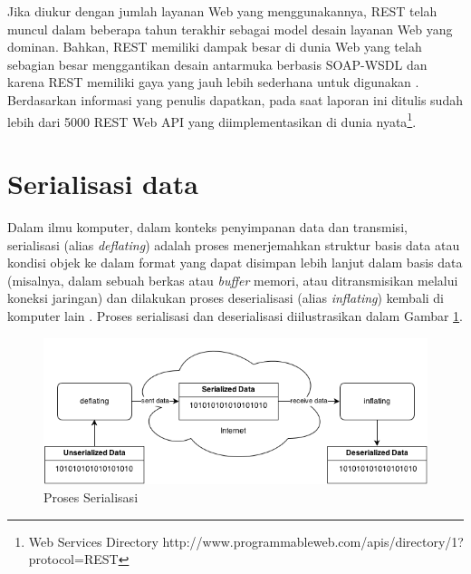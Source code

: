 \documentclass[a4paper, 12pt, oneside]{report}
\begin{document}
\onehalfspacing Jika diukur dengan jumlah layanan Web yang menggunakannya, REST telah muncul dalam beberapa tahun terakhir sebagai model desain layanan Web yang dominan. Bahkan, REST memiliki dampak besar di dunia Web yang telah sebagian besar menggantikan desain antarmuka berbasis SOAP-WSDL dan karena REST memiliki gaya yang jauh lebih sederhana untuk digunakan \cite{ws-restful}. Berdasarkan informasi yang penulis dapatkan, pada saat laporan ini ditulis sudah lebih dari 5000 REST Web API yang diimplementasikan di dunia nyata\footnote{Web Services Directory http://www.programmableweb.com/apis/directory/1?protocol=REST}.

\section{Serialisasi data}

\onehalfspacing Dalam ilmu komputer, dalam konteks penyimpanan data dan transmisi, serialisasi (alias \textit{deflating}) adalah proses menerjemahkan struktur basis data atau kondisi objek ke dalam format yang dapat disimpan lebih lanjut dalam basis data (misalnya, dalam sebuah berkas atau \textit{buffer} memori, atau ditransmisikan melalui koneksi jaringan) dan dilakukan proses deserialisasi (alias \textit{inflating}) kembali di komputer lain \cite{serialization-wikipedia}. Proses serialisasi dan deserialisasi diilustrasikan dalam Gambar \ref{Proses Serialisasi}.

\onehalfspacing 
\begin{figure}[htp]
\centering
\includegraphics[scale=0.65]{images/serialization-process.png}
\caption{Proses Serialisasi}
\label{Proses Serialisasi}
\end{figure}
\end{document}
